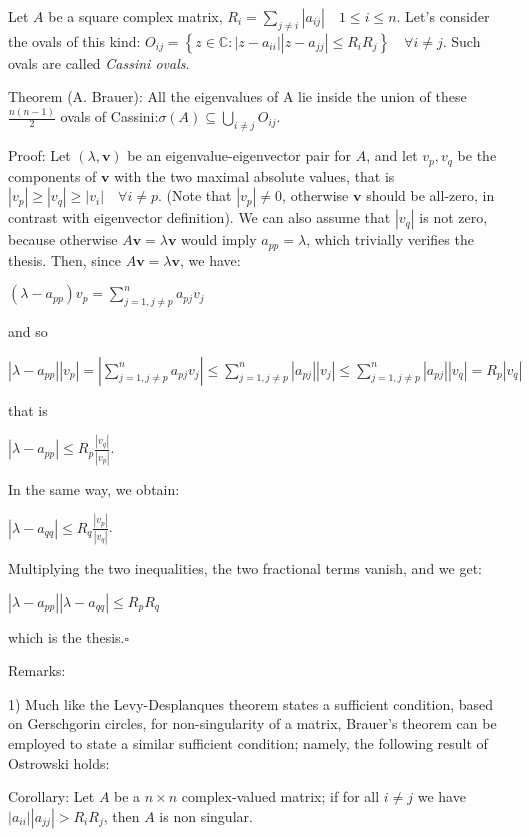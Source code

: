 \documentclass[12pt]{article}
\begin{document}
Let $A$ be a square complex matrix, $R_i=\sum_{j\ne i}\left|a_{ij}\right|\quad 1\leq i\leq n$. Let's consider the ovals of this kind: $O_{ij}=\left\{z\in\mathbb{C}:\left|z-a_{ii}\right|\left|z-a_{jj}\right|\leq R_iR_j\right\}\quad \forall i\ne j$. Such ovals are called \emph{Cassini ovals}.

Theorem (A. Brauer): All the eigenvalues of A lie inside the union of these $\frac{n(n-1)}{2}$ ovals of Cassini:$\sigma(A)\subseteq\bigcup_{i\ne j}O_{ij}$.

Proof:
Let $(\lambda,\mathbf{v})$ be an eigenvalue-eigenvector pair for $A$, and let $v_p,v_q$ be the components of $\mathbf{v}$ with the two maximal absolute values, that is $\left|v_p\right|\geq\left|v_q\right|\geq\left|v_i\right|\quad \forall i\ne p$. (Note that $\left|v_p\right|\ne 0$, otherwise $\mathbf{v}$ should be all-zero, in contrast with eigenvector definition). We can also assume that $\left|v_q\right|$ is not zero, because otherwise $A\mathbf{v}=\lambda\mathbf{v}$ would imply $a_{pp}=\lambda$, which trivially verifies the thesis. Then, since $A\mathbf{v}=\lambda\mathbf{v}$, we have:

$(\lambda-a_{pp})v_p=\sum_{j=1,j\ne p}^n a_{pj}v_j$

and so

$\left|\lambda-a_{pp}\right|\left|v_p\right|=\left|\sum_{j=1,j\ne p}^n a_{pj}v_j\right|\leq\sum_{j=1,j\ne p}^n\left|a_{pj}\right|\left|v_j\right|\leq\sum_{j=1,j\ne p}^n\left|a_{pj}\right|\left|v_q\right|=R_p\left|v_q\right|$

that is

$\left|\lambda-a_{pp}\right|\leq R_p\frac{\left|v_q\right|}{\left|v_p\right|}$.

In the same way, we obtain:

$\left|\lambda-a_{qq}\right|\leq R_q\frac{\left|v_p\right|}{\left|v_q\right|}$.

Multiplying the two inequalities, the two fractional terms vanish, and we get:

$\left|\lambda-a_{pp}\right|\left|\lambda-a_{qq}\right|\leq R_pR_q$

which is the thesis.$\square$

Remarks:

1) Much like the Levy-Desplanques theorem states a sufficient condition, based on Gerschgorin circles, for non-singularity of a matrix, Brauer's theorem can be employed to state a similar sufficient condition; namely, the following result of Ostrowski holds:

Corollary: Let $A$ be a $n\times n$ complex-valued matrix; if for all $i\ne j$ we have $\left|a_{ii}\right|\left|a_{jj}\right|>R_iR_j$, then $A$ is non singular.
\end{document}
